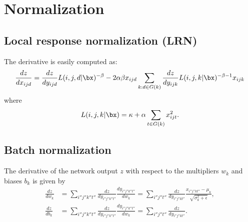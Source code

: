\section{Normalization}\label{s:normalization}

\subsection{Local response normalization (LRN)}\label{s:impl-ccnormalization}

The derivative is easily computed as:
\[
\frac{dz}{d x_{ijd}}
=
\frac{dz}{d y_{ijd}}
L(i,j,d|\bx)^{-\beta}
-2\alpha\beta x_{ijd}
\sum_{k:d\in G(k)}
\frac{dz}{d y_{ijk}}
L(i,j,k|\bx)^{-\beta-1} x_{ijk} 
\]
where
\[
 L(i,j,k|\bx) = \kappa + \alpha \sum_{t\in G(k)} x_{ijt}^2.
\]

\subsection{Batch normalization}\label{s:impl-bnorm}

The derivative of the network output $z$ with respect to the multipliers $w_k$ and biases $b_k$ is given by
\begin{align*}
	\frac{dz}{dw_k} &= \sum_{i''j''k''t''}
\frac{dz}{d y_{i''j''k''t''}} 
\frac{d y_{i''j''k''t''}}{d w_k}
=
\sum_{i''j''t''}
\frac{dz}{d y_{i''j''kt''}} 
\frac{x_{i''j''kt''} - \mu_{k}}{\sqrt{\sigma_k^2 + \epsilon}},
\\
\frac{dz}{db_k} &= \sum_{i''j''k''t''}
\frac{dz}{d y_{i''j''k''t''}} 
\frac{d y_{i''j''k''t''}}{d w_k}
=
\sum_{i''j''t''}
\frac{dz}{d y_{i''j''kt''}}.
\end{align*}


